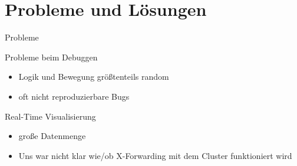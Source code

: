 \section{Probleme und Lösungen}

\begin{frame}{Probleme}
	\begin{block}{Probleme beim Debuggen}
		\begin{itemize}
			\item Logik und Bewegung größtenteils random
			\item oft nicht reproduzierbare Bugs 
		\end{itemize}
	\end{block}
	
	\begin{block} {Real-Time Visualisierung}
		\begin{itemize}
			\item große Datenmenge
			\item Uns war nicht klar wie/ob X-Forwarding mit dem Cluster funktioniert wird
		\end{itemize}
	\end{block}
\end{frame}


	
